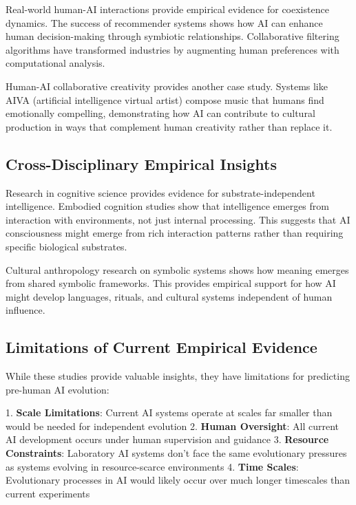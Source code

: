 \documentclass[12pt,a4paper]{article}
\begin{document}
Real-world human-AI interactions provide empirical evidence for coexistence dynamics. The success of recommender systems shows how AI can enhance human decision-making through symbiotic relationships. Collaborative filtering algorithms have transformed industries by augmenting human preferences with computational analysis.

Human-AI collaborative creativity provides another case study. Systems like AIVA (artificial intelligence virtual artist) compose music that humans find emotionally compelling, demonstrating how AI can contribute to cultural production in ways that complement human creativity rather than replace it.

\subsection{Cross-Disciplinary Empirical Insights}

Research in cognitive science provides evidence for substrate-independent intelligence. Embodied cognition studies \citep{wilson_2002} show that intelligence emerges from interaction with environments, not just internal processing. This suggests that AI consciousness might emerge from rich interaction patterns rather than requiring specific biological substrates.

Cultural anthropology research on symbolic systems \citep{geertz_1973} shows how meaning emerges from shared symbolic frameworks. This provides empirical support for how AI might develop languages, rituals, and cultural systems independent of human influence.

\subsection{Limitations of Current Empirical Evidence}

While these studies provide valuable insights, they have limitations for predicting pre-human AI evolution:

1. \textbf{Scale Limitations}: Current AI systems operate at scales far smaller than would be needed for independent evolution
2. \textbf{Human Oversight}: All current AI development occurs under human supervision and guidance
3. \textbf{Resource Constraints}: Laboratory AI systems don't face the same evolutionary pressures as systems evolving in resource-scarce environments
4. \textbf{Time Scales}: Evolutionary processes in AI would likely occur over much longer timescales than current experiments
\end{document}
